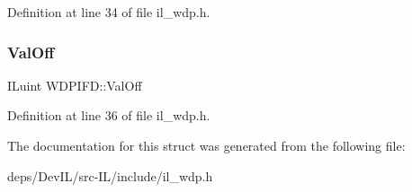 Definition at line 34 of file il\+\_\+wdp.\+h.

\mbox{\label{structWDPIFD_a6705e9f8432f1f34f299a106245212a5}} 
\subsubsection{\texorpdfstring{Val\+Off}{ValOff}}
{\footnotesize\ttfamily I\+Luint W\+D\+P\+I\+F\+D\+::\+Val\+Off}



Definition at line 36 of file il\+\_\+wdp.\+h.



The documentation for this struct was generated from the following file\+:\begin{DoxyCompactItemize}
\item 
deps/\+Dev\+I\+L/src-\/\+I\+L/include/il\+\_\+wdp.\+h\end{DoxyCompactItemize}
